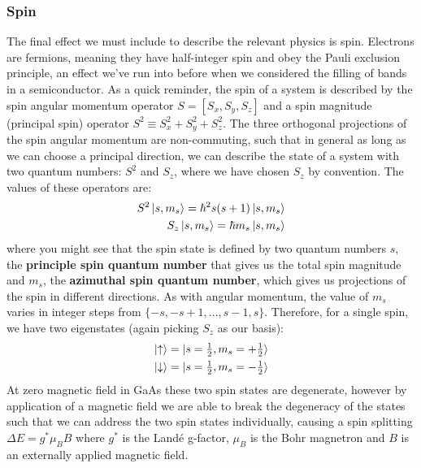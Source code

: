 \subsubsection{Spin}
The final effect we must include to describe the relevant physics is spin. Electrons are fermions, meaning
they have half-integer spin and obey the Pauli exclusion principle, an effect we've run into before when we considered
the filling of bands in a semiconductor. As a quick reminder, the spin of a system is described by the spin angular momentum operator
$S = [S_x, S_y, S_z]$ and a spin magnitude (principal spin) operator $S^2 \equiv S_x^2 + S_y^2 + S_z^2$. The three orthogonal projections of the spin
angular momentum are non-commuting, such that in general as long as we can choose a principal direction, we can describe the
state of a system with two quantum numbers: $S^2$ and $S_z$, where we have chosen $S_z$ by convention. The values of these operators
are:
\begin{eqnarray}
  S^2\ket{s, m_s} = \hbar^2s(s + 1)\ket{s, m_s} \\
  S_z\ket{s, m_s} = \hbar m_s\ket{s, m_s}
\end{eqnarray}
where you might see that the spin state is defined by two quantum numbers $s$, the \textbf{principle spin quantum number} that gives
us the total spin magnitude and $m_s$, the \textbf{azimuthal spin quantum number}, which gives us projections of the spin in different directions.
As with angular momentum, the value of $m_s$ varies in integer steps from $\{-s, -s+1, ..., s-1, s\}$. Therefore, for a single spin, we have two
eigenstates (again picking $S_z$ as our basis):
\begin{eqnarray}
  \ket{\uparrow} &= \ket{s = \tfrac{1}{2}, m_s = +\tfrac{1}{2}} \\
  \ket{\downarrow} &= \ket{s = \tfrac{1}{2}, m_s = -\tfrac{1}{2}}
\end{eqnarray}
At zero magnetic field in GaAs these two spin states are degenerate, however by application of a magnetic
field we are able to break the degeneracy of the states such that we can address the two spin states individually,
causing a spin splitting $\Delta E = g^* \mu_B B$ where $g^*$ is the Landé g-factor, $\mu_B$ is the Bohr
magnetron and $B$ is an externally applied magnetic field.

